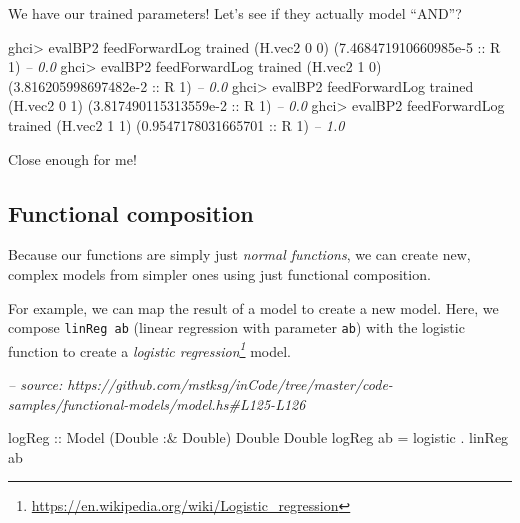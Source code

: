 \documentclass[]{article}
\newenvironment{Shaded}{}{}
\newcommand{\CommentTok}[1]{\textcolor[rgb]{0.38,0.63,0.69}{\textit{#1}}}
\newcommand{\DataTypeTok}[1]{\textcolor[rgb]{0.56,0.13,0.00}{#1}}
\newcommand{\DecValTok}[1]{\textcolor[rgb]{0.25,0.63,0.44}{#1}}
\newcommand{\FloatTok}[1]{\textcolor[rgb]{0.25,0.63,0.44}{#1}}
\newcommand{\FunctionTok}[1]{\textcolor[rgb]{0.02,0.16,0.49}{#1}}
\newcommand{\NormalTok}[1]{#1}
\newcommand{\OtherTok}[1]{\textcolor[rgb]{0.00,0.44,0.13}{#1}}
\renewcommand{\href}[2]{#2\footnote{\url{#1}}}
\begin{document}
We have our trained parameters! Let's see if they actually model ``AND''?

\begin{Shaded}
\begin{Highlighting}[]
\NormalTok{ghci}\FunctionTok{>}\NormalTok{ evalBP2 feedForwardLog trained (H.vec2 }\DecValTok{0} \DecValTok{0}\NormalTok{)}
\NormalTok{(}\FloatTok{7.468471910660985e-5}\OtherTok{ ::} \DataTypeTok{R} \DecValTok{1}\NormalTok{)       }\CommentTok{-- 0.0}
\NormalTok{ghci}\FunctionTok{>}\NormalTok{ evalBP2 feedForwardLog trained (H.vec2 }\DecValTok{1} \DecValTok{0}\NormalTok{)}
\NormalTok{(}\FloatTok{3.816205998697482e-2}\OtherTok{ ::} \DataTypeTok{R} \DecValTok{1}\NormalTok{)       }\CommentTok{-- 0.0}
\NormalTok{ghci}\FunctionTok{>}\NormalTok{ evalBP2 feedForwardLog trained (H.vec2 }\DecValTok{0} \DecValTok{1}\NormalTok{)}
\NormalTok{(}\FloatTok{3.817490115313559e-2}\OtherTok{ ::} \DataTypeTok{R} \DecValTok{1}\NormalTok{)       }\CommentTok{-- 0.0}
\NormalTok{ghci}\FunctionTok{>}\NormalTok{ evalBP2 feedForwardLog trained (H.vec2 }\DecValTok{1} \DecValTok{1}\NormalTok{)}
\NormalTok{(}\FloatTok{0.9547178031665701}\OtherTok{ ::} \DataTypeTok{R} \DecValTok{1}\NormalTok{)         }\CommentTok{-- 1.0}
\end{Highlighting}
\end{Shaded}

Close enough for me!

\hypertarget{functional-composition}{%
\subsection{Functional composition}\label{functional-composition}}

Because our functions are simply just \emph{normal functions}, we can create
new, complex models from simpler ones using just functional composition.

For example, we can map the result of a model to create a new model. Here, we
compose \texttt{linReg\ ab} (linear regression with parameter \texttt{ab}) with
the logistic function to create a
\emph{\href{https://en.wikipedia.org/wiki/Logistic_regression}{logistic
regression}} model.

\begin{Shaded}
\begin{Highlighting}[]
\CommentTok{-- source: https://github.com/mstksg/inCode/tree/master/code-samples/functional-models/model.hs#L125-L126}

\OtherTok{logReg ::} \DataTypeTok{Model}\NormalTok{ (}\DataTypeTok{Double} \FunctionTok{:&} \DataTypeTok{Double}\NormalTok{) }\DataTypeTok{Double} \DataTypeTok{Double}
\NormalTok{logReg ab }\FunctionTok{=}\NormalTok{ logistic }\FunctionTok{.}\NormalTok{ linReg ab}
\end{Highlighting}
\end{Shaded}
\end{document}
